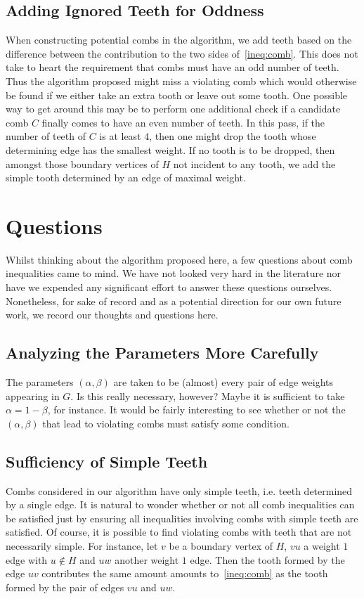 \documentclass[11pt, letterpaper]{amsart}
\theoremstyle{plain}
\theoremstyle{definition}
\theoremstyle{remark}
\begin{document}
\subsection{Adding Ignored Teeth for Oddness}
When constructing potential combs in the algorithm, we add teeth based on the
difference between the contribution to the two sides of~\eqref{ineq:comb}. This
does not take to heart the requirement that combs must have an odd number of
teeth.  Thus the algorithm proposed might miss a violating comb which would
otherwise be found if we either take an extra tooth or leave out some tooth.
One possible way to get around this may be to perform one additional check if a
candidate comb $C$ finally comes to have an even number of teeth. In this pass,
if the number of teeth of $C$ is at least $4$, then one might drop the tooth
whose determining edge has the smallest weight. If no tooth is to be dropped,
then amongst those boundary vertices of $H$ not incident to any tooth, we add
the simple tooth determined by an edge of maximal weight.

\section{Questions}\label{sec:questions}
Whilst thinking about the algorithm proposed here, a few questions about comb
inequalities came to mind. We have not looked very hard in the literature nor
have we expended any significant effort to answer these questions ourselves.
Nonetheless, for sake of record and as a potential direction for our own future
work, we record our thoughts and questions here.

\subsection{Analyzing the Parameters More Carefully}
The parameters $(\alpha,\beta)$ are taken to be (almost) every pair of edge
weights appearing in $G$. Is this really necessary, however?  Maybe it is
sufficient to take $\alpha = 1 - \beta$, for instance. It would be fairly
interesting to see whether or not the $(\alpha,\beta)$ that lead to violating
combs must satisfy some condition.

\subsection{Sufficiency of Simple Teeth}
Combs considered in our algorithm have only simple teeth, i.e. teeth determined
by a single edge. It is natural to wonder whether or not all comb inequalities
can be satisfied just by ensuring all inequalities involving combs with simple
teeth are satisfied. Of course, it is possible to find violating combs with
teeth that are not necessarily simple. For instance, let $v$ be a boundary
vertex of $H$, $vu$ a weight $1$ edge with $u \notin H$ and $uw$ another weight
$1$ edge. Then the tooth formed by the edge $uv$ contributes the same amount
amounts to~\eqref{ineq:comb} as the tooth formed by the pair of edges $vu$ and
$uw$.
\end{document}
